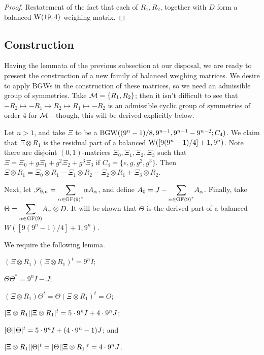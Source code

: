 \documentclass[../../../main]{subfiles}
\begin{document}
 \begin{proof}
  Restatement of the fact that each of $R_1,R_2$, together with  $D$ form a
  balanced $\text{W}(19,4)$ weighing matrix. 
 \end{proof}
 
 \dinkus
 
\subsection{Construction}

Having the lemmata of the previous subsection at our disposal, we are ready to present the construction of a new family of balanced weighing matrices. We desire to apply BGWs in the construction of these matrices, so we need an admissible group of symmetries. Take $\mathcal{M}=\{R_1,R_2\}$; then it isn't difficult to see that $-R_2 \mapsto -R_1 \mapsto R_2 \mapsto R_1 \mapsto -R_2$ is an admissible cyclic group of symmetries of order 4 for $\mathcal{M}$---though, this will be derived explicitly below.

Let $n>1$, and take $\Xi$ to be a $\text{BGW}((9^n-1)/8,9^{n-1},9^{n-1}-9^{n-2};C_4)$. We claim that $\Xi \otimes R_1$ is the residual part of a balanced $\text{W}([9(9^n-1)/4]+1,9^n)$. Note there are disjoint $(0,1)$-matrices $\Xi_0,\Xi_1,\Xi_2,\Xi_3$ such that $\Xi = \Xi_0 + g\Xi_1 + g^2\Xi_2 + g^3\Xi_3$ if $C_4=\{e,g,g^2,g^3\}$. Then $\Xi \otimes R_1 = \Xi_0 \otimes R_1 - \Xi_1 \otimes R_2 - \Xi_2 \otimes R_1 + \Xi_3 \otimes R_2$.

Next, let $\simplex_{9,n}=\ssum_{\alpha\in\gf(9)^*}\alpha A_\alpha$, and define $A_0=J-\ssum_{\alpha\in\gf(9)^*}A_\alpha$. Finally, take $\Theta = \ssum_{\alpha\in\gf(9)} A_\alpha \otimes D$. It will be shown that $\Theta$ is the derived part of a balanced $W([9(9^n-1)/4]+1,9^n)$.

We require the following lemma.

\begin{lem}\label{bw-const-lem}
 \begin{defenum}
  \item[]
  \item\label{bw-const-lem-1} $(\Xi \otimes R_1)(\Xi \otimes R_1)^t = 9^nI$;
  \item\label{bw-const-lem-2} $\Theta\Theta^*=9^nI-J$;
  \item\label{bw-const-lem-3} $(\Xi \otimes R_1)\Theta^t = \Theta(\Xi \otimes R_1)^t = O$;
  \item\label{bw-const-lem-4} $|\Xi \otimes R_1||\Xi \otimes R_1|^t = 5 \cdot 9^nI + 4 \cdot 9^n J$;
  \item\label{bw-const-lem-5} $|\Theta||\Theta|^t = 5 \cdot 9^nI + (4 \cdot 9^n-1)J$; and
  \item\label{bw-const-lem-6} $|\Xi \otimes R_1||\Theta|^t=|\Theta||\Xi \otimes R_1|^t=4 \cdot 9^n J$.
 \end{defenum}
\end{lem}
\end{document}
